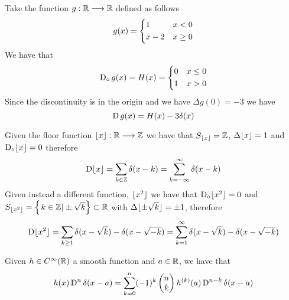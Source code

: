\documentclass[../complete.tex]{subfiles}
\begin{document}
\begin{eg}
	Take the function $g:\mathbb{R}\overset{}{\longrightarrow}\mathbb{R}$ defined as follows
	\begin{equation*}
		g(x)=\begin{dcases}
			1&x<0\\
			x-2&x\ge0
		\end{dcases}
	\end{equation*}
	We have that
	\begin{equation*}
		\operatorname{D_{\circ}} g(x)=H(x)=\begin{dcases}
			0&x\le0\\
			1&x>0\\
		\end{dcases}
	\end{equation*}
	Since the discontinuity is in the origin and we have $\Delta g(0)=-3$ we have
	\begin{equation*}
		\operatorname{\mathrm{D}} g(x)=H(x)-3\delta(x)
	\end{equation*}
\end{eg}
\begin{eg}
	Given the floor function $\lfloor x\rfloor:\mathbb{R}\overset{}{\longrightarrow}\mathbb{Z}$ we have that $S_{\lfloor x\rfloor}=\mathbb{Z}$, $\Delta\lfloor x\rfloor=1$ and $\operatorname{D_{\circ}}\lfloor x\rfloor=0$ therefore
	\begin{equation*}
		\operatorname{\mathrm{D}}\lfloor x\rfloor=\sum_{k\in\mathbb{Z}}\delta(x-k)=\sum_{k=-\infty}^\infty\delta(x-k)
	\end{equation*}
	Given instead a different function, $\lfloor x^2\rfloor$ we have that $\operatorname{D_{\circ}}\lfloor x^2\rfloor=0$ and $S_{\lfloor x^2\rfloor}=\left\{\left.k\in\mathbb{Z}\right|_{} \pm\sqrt{k} \right\}\subset\mathbb{R}$ with $\Delta\lfloor \pm\sqrt{k}\rfloor=\pm1$, therefore
	\begin{equation*}
		\operatorname{\mathrm{D}}\lfloor x^2\rfloor=\sum_{k\ge1}\delta(x-\sqrt{k})-\delta(x-\sqrt{-k})=\sum_{k=1}^{\infty}\delta(x-\sqrt{k})-\delta(x-\sqrt{-k})
	\end{equation*}
\end{eg}
\begin{thm}
	Given $h\in C^\infty(\mathbb{R})$ a smooth function and $a\in\mathbb{R}$, we have that
	\begin{equation*}
		h(x)\operatorname{\mathrm{D}}^n\delta(x-a)=\sum_{k=0}^{n}(-1)^k\begin{pmatrix}n\\k\end{pmatrix}h^{(k)}(a)\operatorname{\mathrm{D}}^{n-k}\delta(x-a)
	\end{equation*}
\end{thm}
\end{document}
